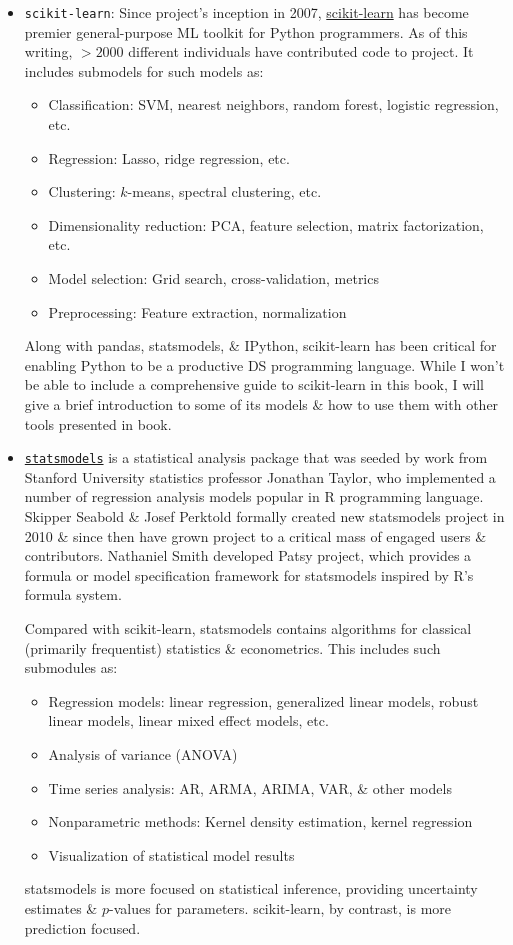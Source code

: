 \documentclass{article}
\begin{document}
\begin{enumerate}
\begin{itemize}
\begin{itemize}
\begin{itemize}
				\item {\tt scikit-learn}: Since project's inception in 2007, \href{https://scikit-learn.org}{scikit-learn} has become premier general-purpose ML toolkit for Python programmers. As of this writing, $> 2000$ different individuals have contributed code to project. It includes submodels for such models as:
				\begin{itemize}
					\item Classification: SVM, nearest neighbors, random forest, logistic regression, etc.
					\item Regression: Lasso, ridge regression, etc.
					\item Clustering: $k$-means, spectral clustering, etc.
					\item Dimensionality reduction: PCA, feature selection, matrix factorization, etc.
					\item Model selection: Grid search, cross-validation, metrics
					\item Preprocessing: Feature extraction, normalization
				\end{itemize}
				Along with pandas, statsmodels, \& IPython, scikit-learn has been critical for enabling Python to be a productive DS programming language. While I won't be able to include a comprehensive guide to scikit-learn in this book, I will give a brief introduction to some of its models \& how to use them with other tools presented in book.
				\item \href{https://statsmodels.org}{\tt statsmodels} is a statistical analysis package that was seeded by work from Stanford University statistics professor {\sc Jonathan Taylor}, who implemented a number of regression analysis models popular in R programming language. {\sc Skipper Seabold \& Josef Perktold} formally created new statsmodels project in 2010 \& since then have grown project to a critical mass of engaged users \& contributors. {\sc Nathaniel Smith} developed Patsy project, which provides a formula or model specification framework for statsmodels inspired by R's formula system.
				
				Compared with scikit-learn, statsmodels contains algorithms for classical (primarily frequentist) statistics \& econometrics. This includes such submodules as:
				\begin{itemize}
					\item Regression models: linear regression, generalized linear models, robust linear models, linear mixed effect models, etc.
					\item Analysis of variance (ANOVA)
					\item Time series analysis: AR, ARMA, ARIMA, VAR, \& other models
					\item Nonparametric methods: Kernel density estimation, kernel regression
					\item Visualization of statistical model results
				\end{itemize}
				statsmodels is more focused on statistical inference, providing uncertainty estimates \& $p$-values for parameters. scikit-learn, by contrast, is more prediction focused.
				

\end{itemize}
\end{itemize}
\end{itemize}
\end{enumerate}
\end{document}
